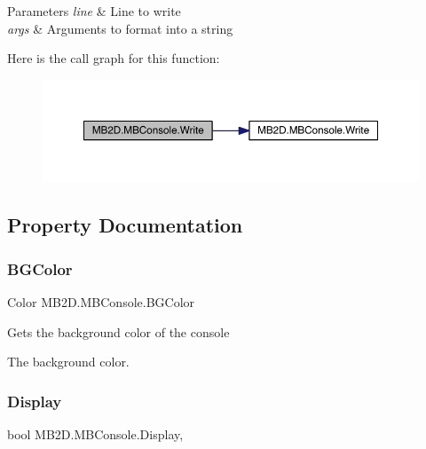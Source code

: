 \begin{DoxyParams}{Parameters}
{\em line} & Line to write\\
\hline
{\em args} & Arguments to format into a string\\
\hline
\end{DoxyParams}
Here is the call graph for this function\+:
\nopagebreak
\begin{figure}[H]
\begin{center}
\leavevmode
\includegraphics[width=350pt]{class_m_b2_d_1_1_m_b_console_ad7f7617e28472374b97fee653bd786be_cgraph}
\end{center}
\end{figure}


\subsection{Property Documentation}
\hypertarget{class_m_b2_d_1_1_m_b_console_a03439bac4bc6f5c737d221b3a093792d}{}\label{class_m_b2_d_1_1_m_b_console_a03439bac4bc6f5c737d221b3a093792d} 
\subsubsection{\texorpdfstring{B\+G\+Color}{BGColor}}
{\footnotesize\ttfamily Color M\+B2\+D.\+M\+B\+Console.\+B\+G\+Color\hspace{0.3cm}{\ttfamily [get]}}



Gets the background color of the console 

The background color.\hypertarget{class_m_b2_d_1_1_m_b_console_a44be86cd008f735652365afccc777ad1}{}\label{class_m_b2_d_1_1_m_b_console_a44be86cd008f735652365afccc777ad1} 
\subsubsection{\texorpdfstring{Display}{Display}}
{\footnotesize\ttfamily bool M\+B2\+D.\+M\+B\+Console.\+Display\hspace{0.3cm}{\ttfamily [get]}, {\ttfamily [set]}}



